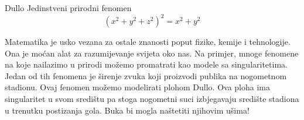 \begin{surferPage}{Dullo}
Jedinstveni prirodni fenomen\\
\smallskip
\[(x^2+ y^2+ z^2)^2	= x^2+ y^2\]

\singlespacing
Matematika je usko vezana za ostale znanosti poput fizike, kemije i tehnologije. Ona je mo\'{c}an alat za razumijevanje svijeta oko nas. 
\singlespacing
Na primjer, mnoge fenomene na koje nailazimo u prirodi mo\v{z}emo promatrati kao modele sa singularitetima.
\singlespacing
Jedan od tih fenomena je \v{s}irenje zvuka koji proizvodi publika na nogometnom stadionu. Ovaj fenomen mo\v{z}emo modelirati plohom Dullo. Ova ploha ima singularitet u svom sredi\v{s}tu pa stoga nogometni suci izbjegavaju sredi\v{s}te stadiona u trenutku postizanja gola. Buka bi mogla na\v{s}tetiti njihovim u\v{s}ima!

\end{surferPage}
